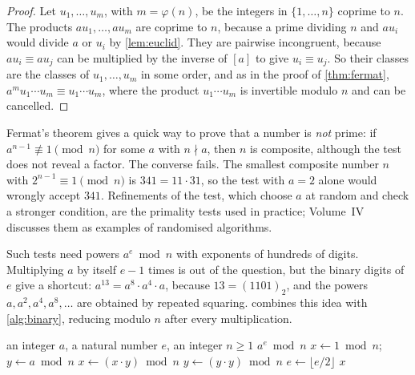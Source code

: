 \begin{proof}
Let $u_1,\ldots,u_m$, with $m=\varphi(n)$, be the integers in $\{1,\ldots,n\}$ coprime to $n$. The products $au_1,\ldots,au_m$ are coprime to $n$, because a prime dividing $n$ and $au_i$ would divide $a$ or $u_i$ by \cref{lem:euclid}. They are pairwise incongruent, because $au_i\equiv au_j$ can be multiplied by the inverse of $[a]$ to give $u_i\equiv u_j$. So their classes are the classes of $u_1,\ldots,u_m$ in some order, and as in the proof of \cref{thm:fermat}, $a^mu_1\cdots u_m\equiv u_1\cdots u_m$, where the product $u_1\cdots u_m$ is invertible modulo $n$ and can be cancelled.
\end{proof}

Fermat's theorem gives a quick way to prove that a number is \emph{not} prime: if $a^{n-1}\not\equiv1\pmod n$ for some $a$ with $n\nmid a$, then $n$ is composite, although the test does not reveal a factor. The converse fails. The smallest composite number $n$ with $2^{n-1}\equiv1\pmod n$ is $341=11\cdot31$, so the test with $a=2$ alone would wrongly accept $341$. Refinements of the test, which choose $a$ at random and check a stronger condition, are the primality tests used in practice; Volume~IV discusses them as examples of randomised algorithms.

Such tests need powers $a^e\bmod n$ with exponents of hundreds of digits. Multiplying $a$ by itself $e-1$ times is out of the question, but the binary digits of $e$ give a shortcut: $a^{13}=a^8\cdot a^4\cdot a$, because $13=(1101)_2$, and the powers $a,a^2,a^4,a^8,\ldots$ are obtained by repeated squaring.  combines this idea with \cref{alg:binary}, reducing modulo $n$ after every multiplication.

\begin{algorithm}
\begin{algorithmic}[1]
\Require an integer $a$, a natural number $e$, an integer $n\ge1$
\Ensure $a^e\bmod n$
\State $x\gets1\bmod n$; \ $y\gets a\bmod n$
 
    \State $x\gets(x\cdot y)\bmod n$
  \EndIf
  \State $y\gets(y\cdot y)\bmod n$
  \State $e\gets\lfloor e/2\rfloor$
\EndWhile
\State \Return $x$
\end{algorithmic}
\caption{Modular exponentiation by repeated squaring; $e_0$ denotes the input value of $e$. The loop runs once for each binary digit of $e_0$.}
\label{alg:powmod}
\end{algorithm}

